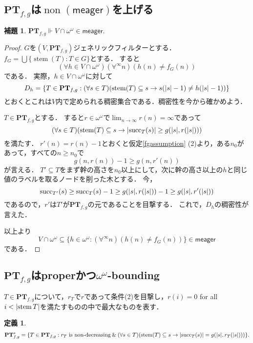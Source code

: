 \documentclass[uplatex]{jsarticle}
\newcommand\forces{\Vdash}
\newcommand{\non}{\operatorname{non}}
\newcommand{\meager}{\mathsf{meager}}
\newcommand{\stem}{\operatorname{stem}}
\newcommand{\suc}{\operatorname{succ}}
\newcommand{\PTfg}{\mathbf{PT}_{f,g}}
\newcommand{\AND}{\mathbin{\&}}
\DeclarePairedDelimiter\abs{\lvert}{\rvert}
\renewcommand\subset{\subseteq}
\theoremstyle{definition}
\newtheorem{defi}[thm]{定義}
\newtheorem{lem}[thm]{補題}
\begin{document}
	\subsection{$\PTfg$は$\non(\meager)$を上げる}

	\begin{lem}
		$\PTfg \forces V \cap \omega^\omega \in \meager$.
	\end{lem}
	\begin{proof}
		$G$を$(V, \PTfg)$ジェネリックフィルターとする．
		$f_G = \bigcup \{ \stem(T) : T \in G \}$とする．
		すると
		\[
		(\forall h \in V \cap \omega^\omega)(\forall^\infty n)(h(n) \ne f_G(n))
		\]
		である．
		実際，$h \in V \cap \omega^\omega$に対して
		\[
		D_h = \{ T \in \PTfg : (\forall s \in T)(\stem(T) \subset s \rightarrow s(\abs{s}-1) \ne h(\abs{s}-1)) \}
		\]
		とおくとこれは$V$内で定められる稠密集合である．稠密性を今から確かめよう．
		
		$T \in \PTfg$とする．
		すると$r \in \omega^\omega$で$\lim_{n \to \infty} r(n) = \infty$であって
		\[
		(\forall s \in T)(\stem(T) \subset s \rightarrow \abs{\suc_T(s)} \ge g(\abs{s}, r(\abs{s})))
		\]
		を満たす．
		$r'(n) = r(n) - 1$とおくと仮定\ref{fgassumption} (2)より，ある$n_0$があって，すべての$n \ge n_0$で
		\[
		g(n, r(n)) - 1 \ge g(n , r'(n))
		\]
		が言える．
		$T' \subset T$をまず幹の高さを$n_0$以上にして，次に幹の高さ以上の$h$と同じ値のラベルを取るノードを削った木とする．
		今，
		\[
		\suc_{T'}(s) \ge \suc_T(s) - 1 \ge g(\abs{s}, r(\abs{s})) - 1 \ge g(\abs{s}, r'(\abs{s}))
		\]
		であるので，$r'$は$T'$が$\PTfg$の元であることを目撃する．
		これで，$D_h$の稠密性が言えた．
		
		以上より
		\[
		V \cap \omega^\omega \subset \{ h \in \omega^\omega : (\forall^\infty n)(h(n) \ne f_G(n)) \} \in \meager
		\]
		である．
		\end{proof}

	\subsection{$\PTfg$はproperかつ$\omega^\omega$-bounding}

	$T \in \PTfg$について，$r_T$で$r$であって条件(2)を目撃し，$r(i) = 0$ for all $i < \abs{\stem{T}}$を満たすものの中で最大なものを表す．
	
	\begin{defi}
		\begin{align*}
		\PTfg^* = \{ T \in \PTfg : r_T \text{ is non-decreasing} \AND (\forall s \in T)(\stem(T) \subset s \rightarrow \abs{\suc_T(s)} = g(\abs{s}, r_T(\abs{s}))) \}.
		\end{align*}
	\end{defi}
\end{document}
